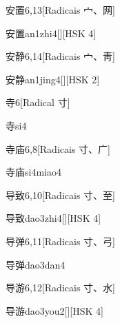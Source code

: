 \begin{entry}{安置}{6,13}[Radicais ⼧、⽹]
  \begin{phonetics}{安置}{an1zhi4}[][HSK 4]
  \end{phonetics}
\end{entry}

\begin{entry}{安静}{6,14}[Radicais ⼧、⾭]
  \begin{phonetics}{安静}{an1jing4}[][HSK 2]
  \end{phonetics}
\end{entry}

\begin{entry}{寺}{6}[Radical ⼨]
  \begin{phonetics}{寺}{si4}
  \end{phonetics}
\end{entry}

\begin{entry}{寺庙}{6,8}[Radicais ⼨、⼴]
  \begin{phonetics}{寺庙}{si4miao4}
  \end{phonetics}
\end{entry}

\begin{entry}{导致}{6,10}[Radicais ⼨、⾄]
  \begin{phonetics}{导致}{dao3zhi4}[][HSK 4]
  \end{phonetics}
\end{entry}

\begin{entry}{导弹}{6,11}[Radicais ⼨、⼸]
  \begin{phonetics}{导弹}{dao3dan4}
  \end{phonetics}
\end{entry}

\begin{entry}{导游}{6,12}[Radicais ⼨、⽔]
  \begin{phonetics}{导游}{dao3you2}[][HSK 4]
  \end{phonetics}
\end{entry}

